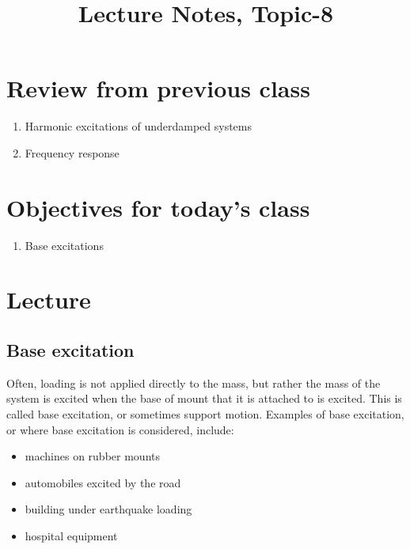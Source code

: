 \documentclass[12pt,a4paper]{article}
\begin{document}
	
	\large{}
	\title{\vspace{-2cm}Lecture Notes, Topic-8}
	\date{}
	\maketitle
	
	\section*{Review from previous class}
		\begin{enumerate}
			\item Harmonic excitations of underdamped systems
			\item Frequency response
		\end{enumerate}
	
	\section*{Objectives for today's class}
	\begin{enumerate}
		\item Base excitations
	\end{enumerate}
	
	\section*{Lecture}
	
		\subsection*{Base excitation}

Often, loading is not applied directly to the mass, but rather the mass of the system is excited when the base of mount that it is attached to is excited. This is called base excitation, or sometimes support motion. Examples of base excitation, or where base excitation is considered, include:

\begin{itemize}
\item machines on rubber mounts
\item automobiles excited by the road
\item building under earthquake loading
\item hospital equipment
\end{itemize}
\end{document}
